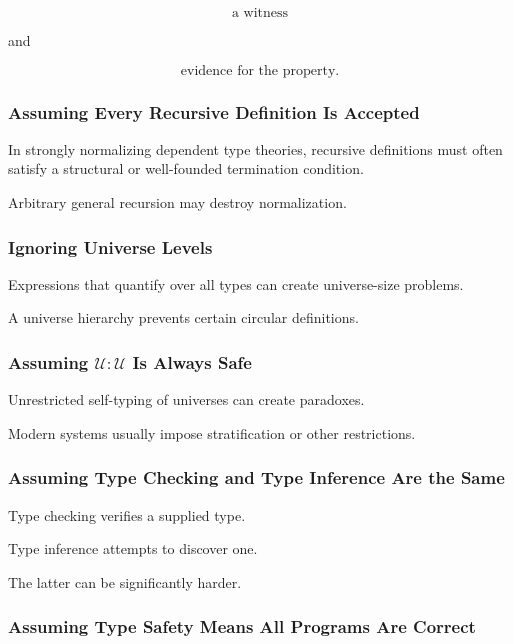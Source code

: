 \[
\boxed{
\text{a witness}
}
\]

and

\[
\boxed{
\text{evidence for the property}.
}
\]

\subsubsection{Assuming Every Recursive Definition Is Accepted}

In strongly normalizing dependent type theories, recursive definitions must
often satisfy a structural or well-founded termination condition.

Arbitrary general recursion may destroy normalization.

\subsubsection{Ignoring Universe Levels}

Expressions that quantify over all types can create universe-size problems.

A universe hierarchy prevents certain circular definitions.

\subsubsection{Assuming \(\mathcal{U}:\mathcal{U}\) Is Always Safe}

Unrestricted self-typing of universes can create paradoxes.

Modern systems usually impose stratification or other restrictions.

\subsubsection{Assuming Type Checking and Type Inference Are the Same}

Type checking verifies a supplied type.

Type inference attempts to discover one.

The latter can be significantly harder.

\subsubsection{Assuming Type Safety Means All Programs Are Correct}

